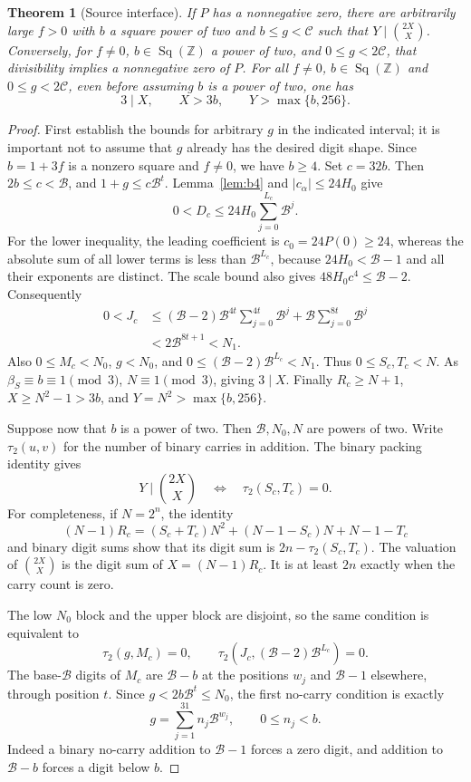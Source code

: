 \documentclass[11pt]{article}
\newtheorem{theorem}{Theorem}
\newcommand{\Z}{\mathbb Z}\newcommand{\N}{\mathbb N}
\newcommand{\Sq}{\operatorname{Sq}(\Z)}
\begin{document}
\begin{theorem}[Source interface]\label{thm:source}
If $P$ has a nonnegative zero, there are arbitrarily large $f>0$ with $b$ a
square power of two and $b\le g<\mathscr C$ such that
$Y\mid\binom{2X}{X}$. Conversely, for $f\ne0$, $b\in\Sq$ a power of two,
and $0\le g<2\mathscr C$, that divisibility implies a nonnegative zero of $P$.
For all $f\ne0$, $b\in\Sq$ and $0\le g<2\mathscr C$, even before assuming
$b$ is a power of two, one has
\[
 3\mid X,\qquad X>3b,\qquad Y>\max\{b,256\}.
\]
\end{theorem}
\begin{proof}
First establish the bounds for arbitrary $g$ in the indicated interval;
it is important not to assume that $g$ already has the desired digit shape.
Since $b=1+3f$ is a nonzero square and $f\ne0$, we have $b\ge4$.
Set $c=32b$. Then $2b\le c<\mathcal B$, and $1+g\le c\mathcal B^t$.
Lemma~\ref{lem:b4} and $|c_\alpha|\le24H_0$ give
\[
 0<D_c\le24H_0\sum_{j=0}^{L_c}\mathcal B^j.
\]
For the lower inequality, the leading coefficient is
$c_0=24P(0)\ge24$, whereas the absolute sum of all lower terms is less than
$\mathcal B^{L_c}$, because $24H_0<\mathcal B-1$ and all their exponents
are distinct. The scale bound also gives
$48H_0c^4\le\mathcal B-2$. Consequently
\begin{align*}
 0<J_c
 &\le(\mathcal B-2)\mathcal B^{4t}
       \sum_{j=0}^{4t}\mathcal B^j
       +\mathcal B\sum_{j=0}^{8t}\mathcal B^j\\
 &<2\mathcal B^{8t+1}<N_1.
\end{align*}
Also $0\le M_c<N_0$, $g<N_0$, and
$0\le(\mathcal B-2)\mathcal B^{L_c}<N_1$.
Thus $0\le S_c,T_c<N$. As $\beta_S\equiv b\equiv1\pmod3$, $N\equiv1\pmod3$,
giving $3\mid X$. Finally $R_c\ge N+1$, $X\ge N^2-1>3b$, and
$Y=N^2>\max\{b,256\}$.

Suppose now that $b$ is a power of two. Then $\mathcal B,N_0,N$ are powers
of two. Write $\tau_2(u,v)$ for the number of binary carries in addition.
The binary packing identity gives
\[
 Y\mid\binom{2X}{X}\quad\Longleftrightarrow\quad\tau_2(S_c,T_c)=0.
\]
For completeness, if $N=2^n$, the identity
\[
 (N-1)R_c=(S_c+T_c)N^2+(N-1-S_c)N+N-1-T_c
\]
and binary digit sums show that its digit sum is $2n-\tau_2(S_c,T_c)$.
The valuation of $\binom{2X}{X}$ is the digit sum of $X=(N-1)R_c$.
It is at least $2n$ exactly when the carry count is zero.

The low $N_0$ block and the upper block are disjoint, so the same condition
is equivalent to
\[
 \tau_2(g,M_c)=0,
 \qquad\tau_2(J_c,(\mathcal B-2)\mathcal B^{L_c})=0.
\]
The base-$\mathcal B$ digits of $M_c$ are $\mathcal B-b$ at the positions
$w_j$ and $\mathcal B-1$ elsewhere, through position $t$.
Since $g<2b\mathcal B^t\le N_0$, the first no-carry condition is exactly
\[
 g=\sum_{j=1}^{31}n_j\mathcal B^{w_j},\qquad 0\le n_j<b.
\]
Indeed a binary no-carry addition to $\mathcal B-1$ forces a zero digit,
and addition to $\mathcal B-b$ forces a digit below $b$.


\end{proof}
\end{document}
